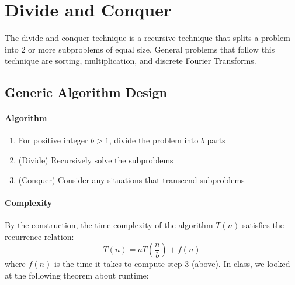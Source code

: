 \documentclass[11pt]{article}
\theoremstyle{plain}
\theoremstyle{definition}
\numberwithin{equation}{section}
\numberwithin{figure}{section}
\begin{document}
\newpage
\section{Divide and Conquer}
The divide and conquer technique is a recursive technique that splits a problem into 2 or more subproblems of equal size. General problems that follow this technique are sorting, multiplication, and discrete Fourier Transforms.

\subsection{Generic Algorithm Design}
\paragraph{Algorithm}
\begin{enumerate}
\item For positive integer $b > 1$, divide the problem into $b$ parts
\item (Divide) Recursively solve the subproblems
\item (Conquer) Consider any situations that transcend subproblems
\end{enumerate}

\paragraph{Complexity} By the construction, the time complexity of the algorithm $T(n)$ satisfies the recurrence relation: 
\begin{equation}
T(n) = a T\left(\frac{n}{b}\right) + f(n)
\end{equation}
where $f(n)$ is the time it takes to compute step 3 (above). In class, we looked at the following theorem about runtime:
\end{document}
